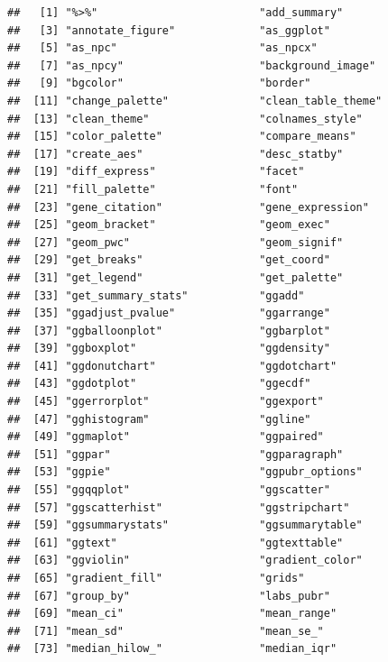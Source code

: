 \documentclass[
]{book}
\begin{document}
\begin{verbatim}
##   [1] "%>%"                         "add_summary"                
##   [3] "annotate_figure"             "as_ggplot"                  
##   [5] "as_npc"                      "as_npcx"                    
##   [7] "as_npcy"                     "background_image"           
##   [9] "bgcolor"                     "border"                     
##  [11] "change_palette"              "clean_table_theme"          
##  [13] "clean_theme"                 "colnames_style"             
##  [15] "color_palette"               "compare_means"              
##  [17] "create_aes"                  "desc_statby"                
##  [19] "diff_express"                "facet"                      
##  [21] "fill_palette"                "font"                       
##  [23] "gene_citation"               "gene_expression"            
##  [25] "geom_bracket"                "geom_exec"                  
##  [27] "geom_pwc"                    "geom_signif"                
##  [29] "get_breaks"                  "get_coord"                  
##  [31] "get_legend"                  "get_palette"                
##  [33] "get_summary_stats"           "ggadd"                      
##  [35] "ggadjust_pvalue"             "ggarrange"                  
##  [37] "ggballoonplot"               "ggbarplot"                  
##  [39] "ggboxplot"                   "ggdensity"                  
##  [41] "ggdonutchart"                "ggdotchart"                 
##  [43] "ggdotplot"                   "ggecdf"                     
##  [45] "ggerrorplot"                 "ggexport"                   
##  [47] "gghistogram"                 "ggline"                     
##  [49] "ggmaplot"                    "ggpaired"                   
##  [51] "ggpar"                       "ggparagraph"                
##  [53] "ggpie"                       "ggpubr_options"             
##  [55] "ggqqplot"                    "ggscatter"                  
##  [57] "ggscatterhist"               "ggstripchart"               
##  [59] "ggsummarystats"              "ggsummarytable"             
##  [61] "ggtext"                      "ggtexttable"                
##  [63] "ggviolin"                    "gradient_color"             
##  [65] "gradient_fill"               "grids"                      
##  [67] "group_by"                    "labs_pubr"                  
##  [69] "mean_ci"                     "mean_range"                 
##  [71] "mean_sd"                     "mean_se_"                   
##  [73] "median_hilow_"               "median_iqr"                 

\end{verbatim}
\end{document}
